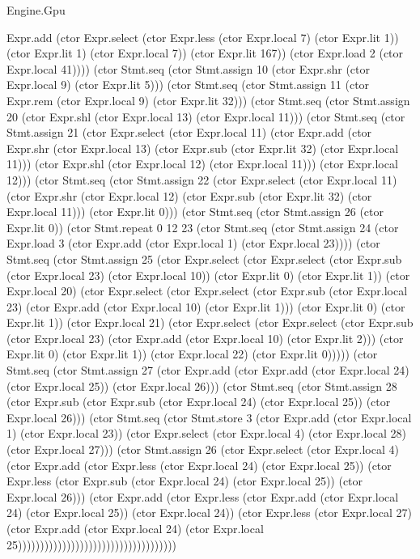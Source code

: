 \begin{lexlean}{Engine.Gpu}
\begin{semanticmodule}
{Expr.add (ctor Expr.select (ctor Expr.less (ctor Expr.local 7) (ctor Expr.lit 1)) (ctor Expr.lit 1) (ctor Expr.local 7)) (ctor Expr.lit 167)) (ctor Expr.load 2 (ctor Expr.local 41)))) (ctor Stmt.seq (ctor Stmt.assign 10 (ctor Expr.shr (ctor Expr.local 9) (ctor Expr.lit 5))) (ctor Stmt.seq (ctor Stmt.assign 11 (ctor Expr.rem (ctor Expr.local 9) (ctor Expr.lit 32))) (ctor Stmt.seq (ctor Stmt.assign 20 (ctor Expr.shl (ctor Expr.local 13) (ctor Expr.local 11))) (ctor Stmt.seq (ctor Stmt.assign 21 (ctor Expr.select (ctor Expr.local 11) (ctor Expr.add (ctor Expr.shr (ctor Expr.local 13) (ctor Expr.sub (ctor Expr.lit 32) (ctor Expr.local 11))) (ctor Expr.shl (ctor Expr.local 12) (ctor Expr.local 11))) (ctor Expr.local 12))) (ctor Stmt.seq (ctor Stmt.assign 22 (ctor Expr.select (ctor Expr.local 11) (ctor Expr.shr (ctor Expr.local 12) (ctor Expr.sub (ctor Expr.lit 32) (ctor Expr.local 11))) (ctor Expr.lit 0))) (ctor Stmt.seq (ctor Stmt.assign 26 (ctor Expr.lit 0)) (ctor Stmt.repeat 0 12 23 (ctor Stmt.seq (ctor Stmt.assign 24 (ctor Expr.load 3 (ctor Expr.add (ctor Expr.local 1) (ctor Expr.local 23)))) (ctor Stmt.seq (ctor Stmt.assign 25 (ctor Expr.select (ctor Expr.select (ctor Expr.sub (ctor Expr.local 23) (ctor Expr.local 10)) (ctor Expr.lit 0) (ctor Expr.lit 1)) (ctor Expr.local 20) (ctor Expr.select (ctor Expr.select (ctor Expr.sub (ctor Expr.local 23) (ctor Expr.add (ctor Expr.local 10) (ctor Expr.lit 1))) (ctor Expr.lit 0) (ctor Expr.lit 1)) (ctor Expr.local 21) (ctor Expr.select (ctor Expr.select (ctor Expr.sub (ctor Expr.local 23) (ctor Expr.add (ctor Expr.local 10) (ctor Expr.lit 2))) (ctor Expr.lit 0) (ctor Expr.lit 1)) (ctor Expr.local 22) (ctor Expr.lit 0))))) (ctor Stmt.seq (ctor Stmt.assign 27 (ctor Expr.add (ctor Expr.add (ctor Expr.local 24) (ctor Expr.local 25)) (ctor Expr.local 26))) (ctor Stmt.seq (ctor Stmt.assign 28 (ctor Expr.sub (ctor Expr.sub (ctor Expr.local 24) (ctor Expr.local 25)) (ctor Expr.local 26))) (ctor Stmt.seq (ctor Stmt.store 3 (ctor Expr.add (ctor Expr.local 1) (ctor Expr.local 23)) (ctor Expr.select (ctor Expr.local 4) (ctor Expr.local 28) (ctor Expr.local 27))) (ctor Stmt.assign 26 (ctor Expr.select (ctor Expr.local 4) (ctor Expr.add (ctor Expr.less (ctor Expr.local 24) (ctor Expr.local 25)) (ctor Expr.less (ctor Expr.sub (ctor Expr.local 24) (ctor Expr.local 25)) (ctor Expr.local 26))) (ctor Expr.add (ctor Expr.less (ctor Expr.add (ctor Expr.local 24) (ctor Expr.local 25)) (ctor Expr.local 24)) (ctor Expr.less (ctor Expr.local 27) (ctor Expr.add (ctor Expr.local 24) (ctor Expr.local 25))))))))))))))))))))))))))))))))))))
}


\end{semanticmodule}
\end{lexlean}
